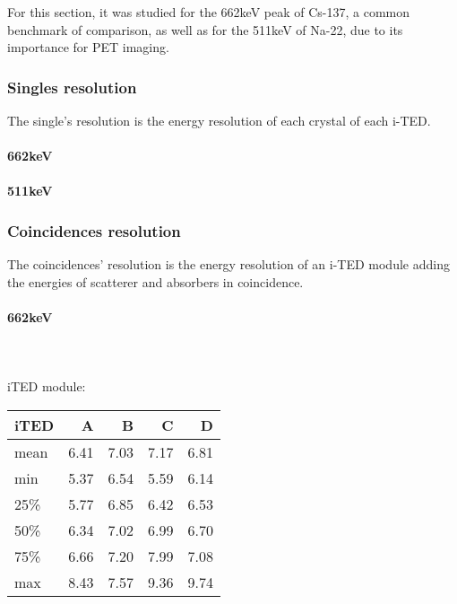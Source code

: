 For this section, it was studied for the 662keV peak of Cs-137, a common benchmark of comparison, as well as for the 511keV of Na-22, due to its importance for PET imaging.

\subsubsection{Singles resolution}

The single's resolution is the energy resolution of each crystal of each i-TED.

\paragraph*{662keV}

\paragraph*{511keV}

\subsubsection{Coincidences resolution}

The coincidences' resolution is the energy resolution of an i-TED module adding the energies of scatterer and absorbers in coincidence.

\paragraph*{662keV}\\~\\

iTED module:\\

\begin{tabular}{lrrrr}
    \toprule
    iTED &    A &    B &    C &    D \\
    \midrule
    mean & 6.41 & 7.03 & 7.17 & 6.81 \\
    min  & 5.37 & 6.54 & 5.59 & 6.14 \\
    25\%  & 5.77 & 6.85 & 6.42 & 6.53 \\
    50\%  & 6.34 & 7.02 & 6.99 & 6.70 \\
    75\%  & 6.66 & 7.20 & 7.99 & 7.08 \\
    max  & 8.43 & 7.57 & 9.36 & 9.74 \\
    \bottomrule
\end{tabular}\\

